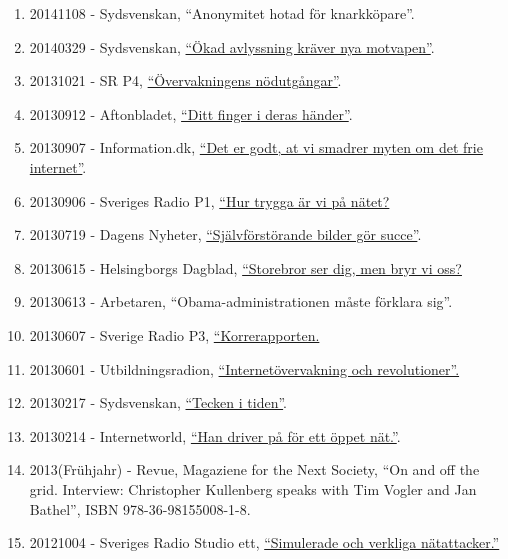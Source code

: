 \documentclass[
]{article}
\begin{document}
\begin{enumerate}
{  senaste offret för Kinas nätcensur''}.
\item
  20141108 - Sydsvenskan, ``Anonymitet hotad för knarkköpare''.
\item
  20140329 - Sydsvenskan,
  \href{http://www.sydsvenskan.se/2014-03-29/okad-avlyssning-kraver-nya-motvapen}{``Ökad
  avlyssning kräver nya motvapen''}.
\item
  20131021 - SR P4, \href{http://t.sr.se/NC8sUF}{``Övervakningens
  nödutgångar''}.
\item
  20130912 - Aftonbladet,
  \href{http://www.aftonbladet.se/nyheter/vetmer/article17455373.ab}{``Ditt
  finger i deras händer''}.
\item
  20130907 - Information.dk,
  \href{http://www.information.dk/471440}{``Det er godt, at vi smadrer
  myten om det frie internet''}.
\item
  20130906 - Sveriges Radio P1, \href{http://t.sr.se/OfP0gG}{``Hur
  trygga är vi på nätet?}
\item
  20130719 - Dagens Nyheter,
  \href{http://www.dn.se/kultur-noje/sjalvforstorande-bilder-gor-succe/}{``Självförstörande
  bilder gör succe''}.
\item
  20130615 - Helsingborgs Dagblad,
  \href{http://www.hd.se/2013-06-15/storebror-ser-dig1.\%20Kullenberg,\%20C.\%20men-bryr-vi-oss}{``Storebror
  ser dig, men bryr vi oss?}
\item
  20130613 - Arbetaren, ``Obama-administrationen måste förklara sig''.
\item
  20130607 - Sverige Radio P3,
  \href{http://t.sr.se/MiZb35}{``Korrerapporten.}
\item
  20130601 - Utbildningsradion,
  \href{http://urskola.se/Produkter/176858-UR-Samtiden-Overvakning-och-kontroll-Internetovervakning-och-revolutioner}{``Internetövervakning
  och revolutioner''.}
\item
  20130217 - Sydsvenskan,
  \href{http://www.sydsvenskan.se/2013-02-17/tecken-i-tiden}{``Tecken i
  tiden''}.
\item
  20130214 - Internetworld,
  \href{http://www.idg.se/2.1085/1.492033/han-driver-pa-for-ett-oppet-nat}{``Han
  driver på för ett öppet nät.''}.
\item
  2013(Frühjahr) - Revue, Magaziene for the Next Society, ``On and off
  the grid. Interview: Christopher Kullenberg speaks with Tim Vogler and
  Jan Bathel'', ISBN 978-36-98155008-1-8.
\item
  20121004 - Sveriges Radio Studio ett,
  \href{http://t.sr.se/1foOdCK}{``Simulerade och verkliga
  nätattacker.''}

\end{enumerate}
\end{document}
